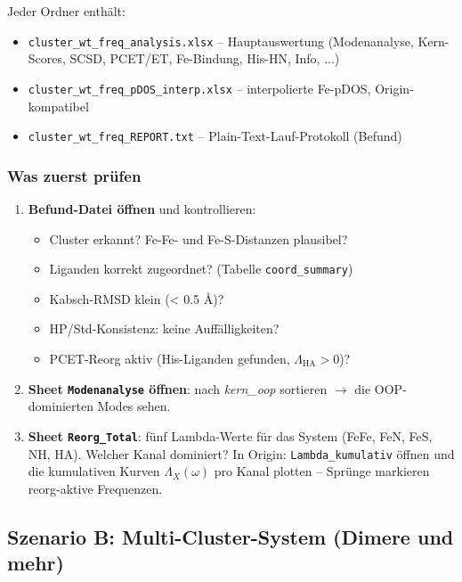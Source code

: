 \documentclass[11pt,a4paper,twoside]{article}
\theoremstyle{remark}
\begin{document}
Jeder Ordner enth\"alt:

\begin{itemize}
  \item \texttt{cluster\_wt\_freq\_analysis.xlsx} -- Hauptauswertung
        (Modenanalyse, Kern-Scores, SCSD, PCET/ET, Fe-Bindung,
        His-HN, Info, ...)
  \item \texttt{cluster\_wt\_freq\_pDOS\_interp.xlsx} -- interpolierte
        Fe-pDOS, Origin-kompatibel
  \item \texttt{cluster\_wt\_freq\_REPORT.txt} -- Plain-Text-Lauf-Protokoll (Befund)
\end{itemize}

\subsubsection*{Was zuerst pr\"ufen}

\begin{enumerate}
  \item \textbf{Befund-Datei \"offnen} und kontrollieren:
    \begin{itemize}
      \item Cluster erkannt? Fe-Fe- und Fe-S-Distanzen plausibel?
      \item Liganden korrekt zugeordnet?
            (Tabelle \texttt{coord\_summary})
      \item Kabsch-RMSD klein (< 0.5 \AA{})?
      \item HP/Std-Konsistenz: keine Auff\"alligkeiten?
      \item PCET-Reorg aktiv (His-Liganden gefunden,
            $\Lambda_\text{HA} > 0$)?
    \end{itemize}
  \item \textbf{Sheet \texttt{Modenanalyse} \"offnen}: nach
        \emph{kern\_oop} sortieren $\to$ die OOP-dominierten Modes
        sehen.
  \item \textbf{Sheet \texttt{Reorg\_Total}}: f\"unf Lambda-Werte
        f\"ur das System (FeFe, FeN, FeS, NH, HA). Welcher Kanal
        dominiert? In Origin: \texttt{Lambda\_kumulativ} \"offnen
        und die kumulativen Kurven $\Lambda_X(\omega)$ pro Kanal
        plotten -- Spr\"unge markieren reorg-aktive Frequenzen.
\end{enumerate}

\subsection{Szenario B: Multi-Cluster-System (Dimere und mehr)}
\label{sec:workflow-multi}
\end{document}
